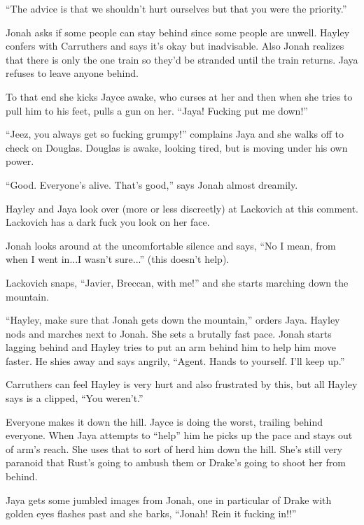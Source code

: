 ``The advice is that we shouldn't hurt ourselves but that you were the priority.''

Jonah asks if some people can stay behind since some people are unwell.  Hayley confers with Carruthers and says it's okay but inadvisable.  Also Jonah realizes that there is only the one train so they'd be stranded until the train returns. Jaya refuses to leave anyone behind.



To that end she kicks Jayce awake, who curses at her and then when she tries to pull him to his feet, pulls a gun on her. ``Jaya!  Fucking put me down!''

``Jeez, you always get so fucking grumpy!'' complains Jaya and she walks off to check on Douglas.  Douglas is awake, looking tired, but is moving under his own power.



``Good.  Everyone's alive.  That's good,'' says Jonah almost dreamily.

Hayley and Jaya look over (more or less discreetly) at Lackovich at this comment.  Lackovich has a dark fuck you look on her face.

Jonah looks around at the uncomfortable silence and says, ``No I mean, from when I went in...I wasn't sure...'' (this doesn't help).  

Lackovich snaps, ``Javier, Breccan, with me!'' and she starts marching down the mountain.



``Hayley, make sure that Jonah gets down the mountain,'' orders Jaya.  Hayley nods and marches next to Jonah.  She sets a brutally fast pace.  Jonah starts lagging behind and Hayley tries to put an arm behind him to help him move faster.  He shies away and says angrily, ``Agent.  Hands to yourself.  I'll keep up.''

Carruthers can feel Hayley is very hurt and also frustrated by this, but all Hayley says is a clipped, ``You weren't.''



Everyone makes it down the hill.  Jayce is doing the worst, trailing behind everyone.  When Jaya attempts to ``help'' him he picks up the pace and stays out of arm's reach.  She uses that to sort of herd him down the hill.  She's still very paranoid that Rust's going to ambush them or Drake's going to shoot her from behind.



Jaya gets some jumbled images from Jonah, one in particular of Drake with golden eyes flashes past and she barks, ``Jonah!  Rein it fucking in!!''

